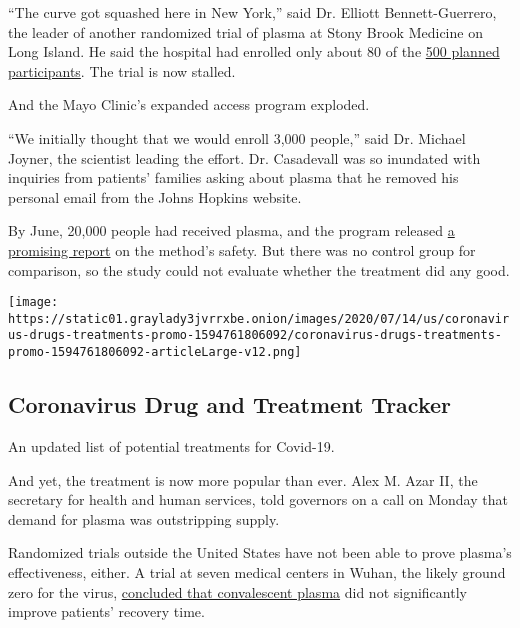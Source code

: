 ``The curve got squashed here in New York,'' said Dr. Elliott
Bennett-Guerrero, the leader of another randomized trial of plasma at
Stony Brook Medicine on Long Island. He said the hospital had enrolled
only about 80 of the
\href{https://clinicaltrials.gov/ct2/show/NCT04344535?term=convalescent+plasma\&type=Intr\&cond=COVID\&intr=randomized\&draw=3\&rank=20}{500
planned participants}. The trial is now stalled.

And the Mayo Clinic's expanded access program exploded.

``We initially thought that we would enroll 3,000 people,'' said Dr.
Michael Joyner, the scientist leading the effort. Dr. Casadevall was so
inundated with inquiries from patients' families asking about plasma
that he removed his personal email from the Johns Hopkins website.

By June, 20,000 people had received plasma, and the program released
\href{https://els-jbs-prod-cdn.jbs.elsevierhealth.com/pb/assets/raw/Health\%20Advance/journals/jmcp/jmcp_ft95_6_8.pdf}{a
promising report} on the method's safety. But there was no control group
for comparison, so the study could not evaluate whether the treatment
did any good.

\href{https://www.nytimes3xbfgragh.onion/interactive/2020/science/coronavirus-drugs-treatments.html}{}

\texttt{[image: https://static01.graylady3jvrrxbe.onion/images/2020/07/14/us/coronavirus-drugs-treatments-promo-1594761806092/coronavirus-drugs-treatments-promo-1594761806092-articleLarge-v12.png]}

\hypertarget{coronavirus-drug-and-treatment-tracker}{%
\subsection{Coronavirus Drug and Treatment
Tracker}\label{coronavirus-drug-and-treatment-tracker}}

An updated list of potential treatments for Covid-19.

And yet, the treatment is now more popular than ever. Alex M. Azar II,
the secretary for health and human services, told governors on a call on
Monday that demand for plasma was outstripping supply.

Randomized trials outside the United States have not been able to prove
plasma's effectiveness, either. A trial at seven medical centers in
Wuhan, the likely ground zero for the virus,
\href{https://jamanetwork.com/journals/jama/article-abstract/2766943}{concluded
that convalescent plasma} did not significantly improve patients'
recovery time.

